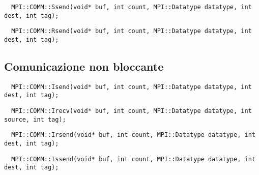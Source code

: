 \begin{lstlisting}
  MPI::COMM::Ssend(void* buf, int count, MPI::Datatype datatype, int dest, int tag);
\end{lstlisting}

\begin{lstlisting}
  MPI::COMM::Rsend(void* buf, int count, MPI::Datatype datatype, int dest, int tag);
\end{lstlisting}

\subsection{Comunicazione non bloccante}

\begin{lstlisting}
  MPI::COMM::Isend(void* buf, int count, MPI::Datatype datatype, int dest, int tag);
\end{lstlisting}

\begin{lstlisting}
  MPI::COMM::Irecv(void* buf, int count, MPI::Datatype datatype, int source, int tag);
\end{lstlisting}

\begin{lstlisting}
  MPI::COMM::Irsend(void* buf, int count, MPI::Datatype datatype, int dest, int tag);
\end{lstlisting}

\begin{lstlisting}
  MPI::COMM::Issend(void* buf, int count, MPI::Datatype datatype, int dest, int tag);
\end{lstlisting}

